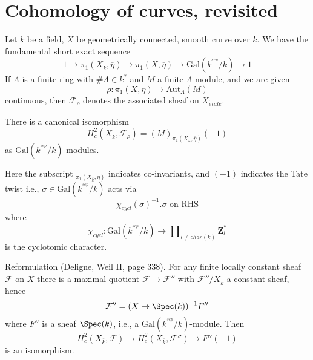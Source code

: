 \section{Cohomology of curves, revisited}
\label{section-cohomology-curves-revisited}

\noindent
Let $k$ be a field, $X$ be geometrically connected, smooth curve over $k$.
We have the fundamental short exact sequence
$$
1 \to
\pi_1(X_{\overline k}, \overline \eta) \to
\pi_1(X, \overline\eta) \to
\text{Gal}(k^{^{sep}}/k) \to 1
$$
If $\Lambda$ is a finite ring with $\#\Lambda\in k^*$ and $M$ a finite
$\Lambda$-module, and we are given
$$
\rho:\pi_1(X, \overline\eta) \to \text{Aut}_{\Lambda}(M)
$$
continuous, then $\mathcal{F}_\rho$ denotes the associated sheaf on
$X_{\acute{e}tale}$.

\begin{lemma}
\label{lemma-identify-h2c}
There is a canonical isomorphism
$$
H_c^2(X_{\overline k}, \mathcal{F}_\rho)=(M)_{\pi_1(X_{\overline k},
\overline\eta)}(-1)
$$
as $\text{Gal}(k^{^{sep}}/k)$-modules.
\end{lemma}

\noindent
Here the subscript ${}_{\pi_1(X_{\overline k}, \overline\eta)}$
indicates co-invariants, and $(-1)$ indicates the Tate twist i.e.,
$\sigma\in \text{Gal}(k^{^{sep}}/k)$ acts via
$$
\chi_{cycl}(\sigma)^{-1}.\sigma\text{ on RHS}
$$
where
$$
\chi_{cycl} :
\text{Gal}(k^{^{sep}}/k)
\to
\prod\nolimits_{l\neq char(k)}\mathbf{Z}_l^*
$$
is the cyclotomic character.

\medskip\noindent
Reformulation (Deligne, Weil II, page 338). For any finite locally
constant sheaf $\mathcal{F}$ on $X$ there is a maximal quotient $\mathcal{F}\to
\mathcal{F}''$ with $\mathcal{F}''/X_{\overline k}$ a constant sheaf, hence
$$
\mathcal{F}'' = (X\to \Spec(k))^{-1}F''
$$
where $F''$ is a sheaf $\Spec(k)$, i.e., a
$\text{Gal}(k^{^{sep}}/k)$-module. Then
$$
H_c^2(X_{\overline k}, \mathcal{F})\to H_c^2(X_{\overline k},
\mathcal{F}'')\to F''(-1)
$$
is an isomorphism.

